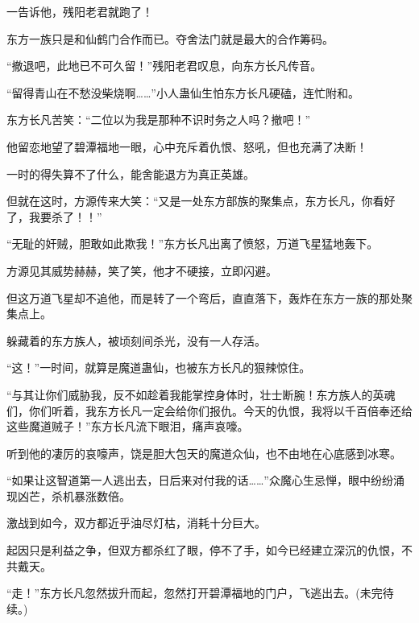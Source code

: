 \begin{this_body}
一告诉他，残阳老君就跑了！

东方一族只是和仙鹤门合作而已。夺舍法门就是最大的合作筹码。

“撤退吧，此地已不可久留！”残阳老君叹息，向东方长凡传音。

“留得青山在不愁没柴烧啊……”小人蛊仙生怕东方长凡硬磕，连忙附和。

东方长凡苦笑：“二位以为我是那种不识时务之人吗？撤吧！”

他留恋地望了碧潭福地一眼，心中充斥着仇恨、怒吼，但也充满了决断！

一时的得失算不了什么，能舍能退方为真正英雄。

但就在这时，方源传来大笑：“又是一处东方部族的聚集点，东方长凡，你看好了，我要杀了！！”

“无耻的奸贼，胆敢如此欺我！”东方长凡出离了愤怒，万道飞星猛地轰下。

方源见其威势赫赫，笑了笑，他才不硬接，立即闪避。

但这万道飞星却不追他，而是转了一个弯后，直直落下，轰炸在东方一族的那处聚集点上。

躲藏着的东方族人，被顷刻间杀光，没有一人存活。

“这！”一时间，就算是魔道蛊仙，也被东方长凡的狠辣惊住。

“与其让你们威胁我，反不如趁着我能掌控身体时，壮士断腕！东方族人的英魂们，你们听着，我东方长凡一定会给你们报仇。今天的仇恨，我将以千百倍奉还给这些魔道贼子！”东方长凡流下眼泪，痛声哀嚎。

听到他的凄厉的哀嚎声，饶是胆大包天的魔道众仙，也不由地在心底感到冰寒。

“如果让这智道第一人逃出去，日后来对付我的话……”众魔心生忌惮，眼中纷纷涌现凶芒，杀机暴涨数倍。

激战到如今，双方都近乎油尽灯枯，消耗十分巨大。

起因只是利益之争，但双方都杀红了眼，停不了手，如今已经建立深沉的仇恨，不共戴天。

“走！”东方长凡忽然拔升而起，忽然打开碧潭福地的门户，飞逃出去。(未完待续。)

\end{this_body}

